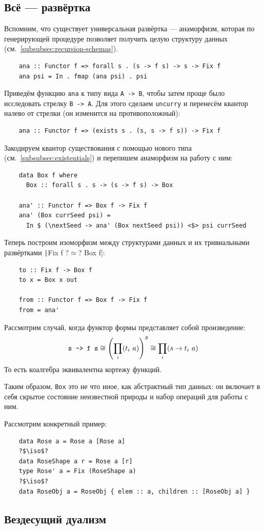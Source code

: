\subsection{Всё --- развёртка} \label{subsec:all-unfolds}

Вспомним, что существует универсальная развёртка --- анаморфизм, которая по генерирующей процедуре позволяет получить целую структуру данных (см.~\ref{subsubsec:recursion-schemas}).
\begin{verbatim}
    ana :: Functor f => forall s . (s -> f s) -> s -> Fix f
    ana psi = In . fmap (ana psi) . psi
\end{verbatim}

Приведём функцию \texttt{ana} к типу вида \texttt{A -> B}, чтобы затем проще было исследовать стрелку \texttt{B -> A}.
Для этого сделаем \texttt{uncurry} и перенесём квантор налево от стрелки (он изменится на противоположный):
\begin{verbatim}
    ana :: Functor f => (exists s . (s, s -> f s)) -> Fix f
\end{verbatim}
Закодируем квантор существования с помощью нового типа (см.~\ref{subsubsec:existentials}) и перепишем анаморфизм на работу с ним:
\begin{verbatim}
    data Box f where
      Box :: forall s . s -> (s -> f s) -> Box

    ana' :: Functor f => Box f -> Fix f
    ana' (Box currSeed psi) =
      In $ (\nextSeed -> ana' (Box nextSeed psi)) <$> psi currSeed
\end{verbatim}
Теперь построим изоморфизм между структурами данных и их тривиальными развёртками \texttt|Fix f ?$\simeq$? Box f|:
\begin{verbatim}
    to :: Fix f -> Box f
    to x = Box x out

    from :: Functor f => Box f -> Fix f
    from = ana'
\end{verbatim}

Рассмотрим случай, когда функтор формы представляет собой произведение:
\[
    \text{\texttt{s -> f s}} \cong \left( \prod_{i}(t_i~ a) \right)^{\displaystyle s} \cong \prod_i(s\to t_i~ a)
\]
То есть коалгебра эквивалентна кортежу функций.

Таким образом, \texttt{Box} это не что иное, как абстрактный тип данных: он включает в себя скрытое состояние неизвестной природы и набор операций для работы с ним.



Рассмотрим конкретный пример:
\begin{verbatim}
    data Rose a = Rose a [Rose a]
    ?$\iso$?
    data RoseShape a r = Rose a [r]
    type Rose' a = Fix (RoseShape a)
    ?$\iso$?
    data RoseObj a = RoseObj { elem :: a, children :: [RoseObj a] }
\end{verbatim}







\subsection{Вездесущий дуализм}



